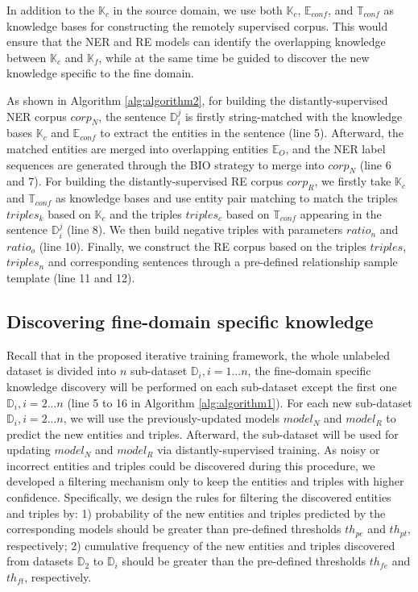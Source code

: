 \documentclass[sigconf]{acmart}
\begin{document}
In addition to the $\mathbb{K}_c$ in the source domain, we use both $\mathbb{K}_c$, $\mathbb{E}_{conf}$, and $\mathbb{T}_{conf}$ as knowledge bases for constructing the remotely supervised corpus. This would ensure that the NER and RE models can identify the overlapping knowledge between $\mathbb{K}_c$ and $\mathbb{K}_f$, while at the same time be guided to discover the new knowledge specific to the fine domain. 

As shown in Algorithm \ref{alg:algorithm2}, for building the distantly-supervised NER corpus $corp_N$, the sentence $\mathbb{D}_i^{j}$ is firstly string-matched with the knowledge bases $\mathbb{K}_c$ and $\mathbb{E}_{conf}$ to extract the entities in the sentence (line 5). Afterward, the matched entities are merged into overlapping entities $\mathbb{E}_O$, and the NER label sequences are generated through the BIO strategy to merge into $corp_N$ (line 6 and 7). For building the distantly-supervised RE corpus $corp_R$, we firstly take $\mathbb{K}_c$ and $\mathbb{T}_{conf}$ as knowledge bases and use entity pair matching to match the triples $triples_k$ based on $\mathbb{K}_c$ and the triples $triples_c$ based on $\mathbb{T}_{conf}$ appearing in the sentence $\mathbb{D}_i^{j}$ (line 8). We then build negative triples with parameters ${ratio_n}$ and ${ratio_o}$ (line 10). Finally, we construct the RE corpus based on the triples $triples$, $triples_n$ and corresponding sentences through a pre-defined relationship sample template (line 11 and 12).

\subsection{Discovering fine-domain specific knowledge}

Recall that in the proposed iterative training framework, the whole unlabeled dataset is divided into $n$ sub-dataset $\mathbb{D}_i,i=1...n$, the fine-domain specific knowledge discovery will be performed on each sub-dataset except the first one $\mathbb{D}_i,i=2...n$ (line 5 to 16 in Algorithm \ref{alg:algorithm1}). For each new sub-dataset $\mathbb{D}_i,i=2...n$, we will use the previously-updated models $model_N$ and $model_R$ to predict the new entities and triples. Afterward, the sub-dataset will be used for updating $model_N$ and $model_R$ via distantly-supervised training. As noisy or incorrect entities and triples could be discovered during this procedure, we developed a filtering mechanism only to keep the entities and triples with higher confidence. Specifically, we design the rules for filtering the discovered entities and triples by: 1) probability of the new entities and triples predicted by the corresponding models should be greater than pre-defined thresholds $th_{pe}$ and $th_{pt}$, respectively; 2) cumulative frequency of the new entities and triples discovered from datasets $\mathbb{D}_2$ to $\mathbb{D}_i$ should be greater than the pre-defined thresholds $th_{fe}$ and $th_{ft}$, respectively.
\end{document}
